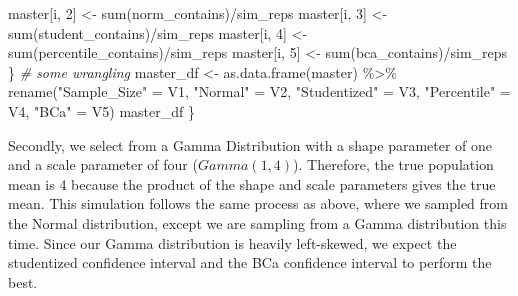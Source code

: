 \documentclass[12pt]{article}
\newenvironment{Shaded}{\begin{snugshade}}{\end{snugshade}}
\newcommand{\CommentTok}[1]{\textcolor[rgb]{0.56,0.35,0.01}{\textit{#1}}}
\newcommand{\DecValTok}[1]{\textcolor[rgb]{0.00,0.00,0.81}{#1}}
\newcommand{\FunctionTok}[1]{\textcolor[rgb]{0.00,0.00,0.00}{#1}}
\newcommand{\NormalTok}[1]{#1}
\newcommand{\OtherTok}[1]{\textcolor[rgb]{0.56,0.35,0.01}{#1}}
\newcommand{\SpecialCharTok}[1]{\textcolor[rgb]{0.00,0.00,0.00}{#1}}
\newcommand{\StringTok}[1]{\textcolor[rgb]{0.31,0.60,0.02}{#1}}
\begin{document}
\begin{Shaded}
\begin{Highlighting}[]
\NormalTok{    master[i, }\DecValTok{2}\NormalTok{] }\OtherTok{\textless{}{-}} \FunctionTok{sum}\NormalTok{(norm\_contains)}\SpecialCharTok{/}\NormalTok{sim\_reps}
\NormalTok{    master[i, }\DecValTok{3}\NormalTok{] }\OtherTok{\textless{}{-}} \FunctionTok{sum}\NormalTok{(student\_contains)}\SpecialCharTok{/}\NormalTok{sim\_reps}
\NormalTok{    master[i, }\DecValTok{4}\NormalTok{] }\OtherTok{\textless{}{-}} \FunctionTok{sum}\NormalTok{(percentile\_contains)}\SpecialCharTok{/}\NormalTok{sim\_reps}
\NormalTok{    master[i, }\DecValTok{5}\NormalTok{] }\OtherTok{\textless{}{-}} \FunctionTok{sum}\NormalTok{(bca\_contains)}\SpecialCharTok{/}\NormalTok{sim\_reps}
\NormalTok{  \}}
  \CommentTok{\# some wrangling}
\NormalTok{  master\_df }\OtherTok{\textless{}{-}} \FunctionTok{as.data.frame}\NormalTok{(master) }\SpecialCharTok{\%\textgreater{}\%} 
      \FunctionTok{rename}\NormalTok{(}\StringTok{"Sample\_Size"} \OtherTok{=}\NormalTok{ V1, }\StringTok{"Normal"} \OtherTok{=}\NormalTok{ V2, }\StringTok{"Studentized"} \OtherTok{=}\NormalTok{ V3, }
             \StringTok{"Percentile"} \OtherTok{=}\NormalTok{ V4, }\StringTok{"BCa"} \OtherTok{=}\NormalTok{ V5) }
\NormalTok{  master\_df}
\NormalTok{\}}
\end{Highlighting}
\end{Shaded}

Secondly, we select from a Gamma Distribution with a shape parameter of
one and a scale parameter of four (\(Gamma(1,4)\)). Therefore, the true
population mean is 4 because the product of the shape and scale
parameters gives the true mean. This simulation follows the same process
as above, where we sampled from the Normal distribution, except we are
sampling from a Gamma distribution this time. Since our Gamma
distribution is heavily left-skewed, we expect the studentized
confidence interval and the BCa confidence interval to perform the best.
\end{document}
